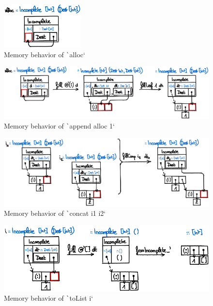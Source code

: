 \documentclass[english]{jflart}
\begin{document}
\begin{figure}[t]\centering
  \includegraphics[width=4.2cm]{alloc.png}
  \caption{Memory behavior of \texttt`alloc`}
  \label{fig:schema-alloc}
\end{figure}

\begin{figure}[t]\centering
  \includegraphics[width=14cm]{dlist-append.png}
  \caption{Memory behavior of \texttt`append alloc 1`}
  \label{fig:schema-dlist-append}
\end{figure}

\begin{figure}[t]\centering
  \includegraphics[width=14cm]{dlist-concat.png}
  \caption{Memory behavior of \texttt`concat i1 i2`}
  \label{fig:schema-dlist-concat}
\end{figure}

\begin{figure}[t]\centering
  \includegraphics[width=11.5cm]{dlist-toList.png}
  \caption{Memory behavior of \texttt`toList i`}
  \label{fig:schema-dlist-toList}
\end{figure}
\end{document}
